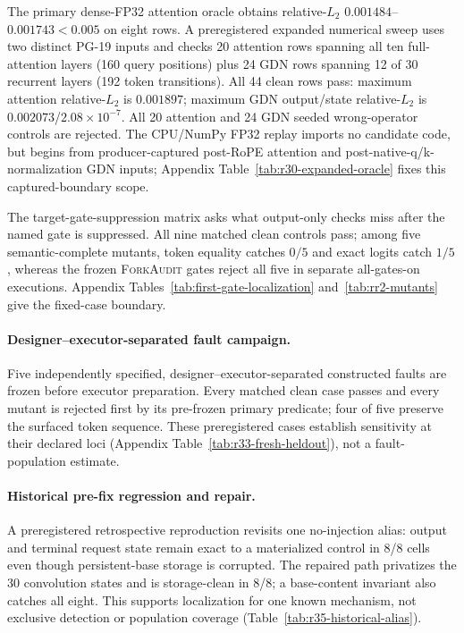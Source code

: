 \documentclass{article}
\newcommand{\method}{\textsc{ForkAudit}}
\begin{document}
The primary dense-FP32 attention oracle obtains relative-$L_2$
$0.001484$--$0.001743<0.005$ on eight rows.  A preregistered expanded numerical sweep uses
two distinct PG-19 inputs and checks 20 attention rows spanning all ten
full-attention layers (160 query positions) plus 24 GDN rows spanning 12 of 30
recurrent layers (192 token transitions).  All 44 clean rows pass:
maximum attention relative-$L_2$ is $0.001897$; maximum GDN output/state
relative-$L_2$ is $0.002073$/$2.08\times10^{-7}$.  All 20 attention and 24 GDN
seeded wrong-operator controls are rejected.  The CPU/NumPy FP32 replay imports
no candidate code, but begins from producer-captured post-RoPE attention and
post-native-q/k-normalization GDN inputs; Appendix
Table~\ref{tab:r30-expanded-oracle} fixes this captured-boundary scope.

The target-gate-suppression matrix asks what output-only checks miss after the
named gate is suppressed.  All nine matched clean controls pass; among five
semantic-complete mutants, token equality catches $0/5$ and exact logits catch
$1/5$, whereas the frozen \method{} gates reject all five in separate
all-gates-on executions.  Appendix Tables~\ref{tab:first-gate-localization}
and~\ref{tab:rr2-mutants} give the fixed-case boundary.

\paragraph{Designer--executor-separated fault campaign.}
Five independently specified, designer--executor-separated constructed faults
are frozen before executor preparation.  Every matched clean case passes and
every mutant is rejected first by its pre-frozen primary predicate; four of
five preserve the surfaced token sequence.  These preregistered cases establish
sensitivity at their declared loci (Appendix
Table~\ref{tab:r33-fresh-heldout}), not a fault-population estimate.

\paragraph{Historical pre-fix regression and repair.}
A preregistered retrospective reproduction revisits one no-injection alias:
output and terminal request state remain exact to a materialized control in
8/8 cells even though persistent-base storage is corrupted.  The repaired path
privatizes the 30 convolution states and is storage-clean in 8/8; a base-content
invariant also catches all eight.  This supports localization for one known
mechanism, not exclusive detection or population coverage
(Table~\ref{tab:r35-historical-alias}).
\end{document}
